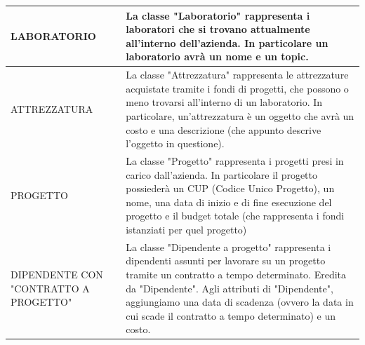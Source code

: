 \begin{tabular}{|C{3.5cm}|L{11.2cm}|}
            \hline
                LABORATORIO &
                La classe "Laboratorio" rappresenta i laboratori che si trovano attualmente all'interno dell'azienda. In particolare un laboratorio avrà un nome e un topic.\\
            \hline
                ATTREZZATURA &
                La classe "Attrezzatura" rappresenta le attrezzature acquistate tramite i fondi di progetti, che possono o meno trovarsi all'interno di un laboratorio. In particolare, un'attrezzatura è un oggetto che avrà un costo e una descrizione (che appunto descrive l'oggetto in questione).\\
            \hline
                PROGETTO &
                La classe "Progetto" rappresenta i progetti presi in carico dall'azienda. In particolare il progetto possiederà un CUP (Codice Unico Progetto), un nome, una data di inizio e di fine esecuzione del progetto e il budget totale (che rappresenta i fondi istanziati per quel progetto)\\
            \hline
                DIPENDENTE CON "CONTRATTO A PROGETTO" &
                La classe "Dipendente a progetto" rappresenta i dipendenti assunti per lavorare su un progetto tramite un contratto a tempo determinato. Eredita da "Dipendente". Agli attributi di "Dipendente", aggiungiamo una data di scadenza (ovvero la data in cui scade il contratto a tempo determinato) e un costo.\\
            \hline   
        \end{tabular}
        
